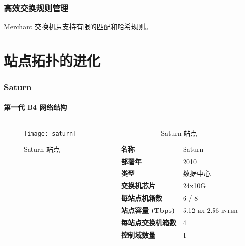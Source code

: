 \begin{frame}
    \frametitle{高效交换规则管理}
    Merchant 交换机只支持有限的匹配和哈希规则。

\end{frame}

\section{站点拓扑的进化}


\begin{frame}
    \frametitle{Saturn}
    \framesubtitle{第一代 B4 网络结构}
    \begin{columns}
        \begin{column}{0.4\textwidth}
            \begin{figure}
                \texttt{[image: saturn]}
                \caption{Saturn 站点}
            \end{figure}
        \end{column}
        \begin{column}{0.6\textwidth}
            \begin{table}
                \begin{tabular}{>{\bfseries}ll}
                    \toprule
                    名称             & Saturn                               \\
                    部署年           & 2010                                 \\
                    类型             & 数据中心                             \\
                    交换机芯片       & 24x10G                               \\
                    每站点机箱数     & 6 / 8                                \\
                    站点容量 (Tbps)  & 5.12 \textsc{ex} 2.56 \textsc{inter} \\
                    每站点交换机箱数 & 4                                    \\
                    控制域数量       & 1                                    \\
                    \bottomrule
                \end{tabular}
                \caption{Saturn 站点}\label{tab:saturn}
            \end{table}
        \end{column}
    \end{columns}
\end{frame}

